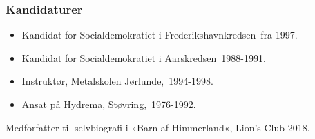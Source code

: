 \documentclass[11pt, a4paper]{awesome-cv}
\begin{document}
\begin{cvletter}
\subsubsection*{Kandidaturer}
\begin{itemize}
\item Kandidat for Socialdemokratiet i Frederikshavnkredsen fra 1997.
\item Kandidat for Socialdemokratiet i Aarskredsen 1988-1991.
\end{itemize}
\begin{itemize}
\item Instruktør, Metalskolen Jørlunde, 1994-1998.
\item Ansat på Hydrema, Støvring, 1976-1992.
\end{itemize}
Medforfatter til selvbiografi i »Barn af Himmerland«, Lion's Club 2018.

\end{cvletter}
\end{document}
